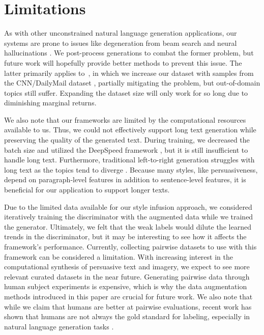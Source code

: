 \section{Limitations}
\label{sec:limitations}

As with other unconstrained natural language generation applications, our systems are prone to issues like degeneration from beam search and neural hallucinations \citep{ji2022survey}. We post-process generations to combat the former problem, but future work will hopefully provide better methods to prevent this issue. The latter primarily applies to~, in which we increase our dataset with samples from the CNN/DailyMail dataset \citep{see-etal-2017-get}, partially mitigating the problem, but out-of-domain topics still suffer. Expanding the dataset size will only work for so long due to diminishing marginal returns.

We also note that our frameworks are limited by the computational resources available to us. Thus, we could not effectively support long text generation while preserving the quality of the generated text. During training, we decreased the batch size and utilized the DeepSpeed framework \citep{rasley-2020-deepspeed}, but it is still insufficient to handle long text. Furthermore, traditional left-to-right generation struggles with long text as the topics tend to diverge \citep{Tan2020}. Because many styles, like persuasiveness, depend on paragraph-level features in addition to sentence-level features, it is beneficial for our application to support longer texts.

Due to the limited data available for our style infusion approach, we considered iteratively training the discriminator with the augmented data while we trained the generator. Ultimately, we felt that the weak labels would dilute the learned trends in the discriminator, but it may be interesting to see how it affects the framework's performance. Currently, collecting pairwise datasets to use with this framework can be considered a limitation. With increasing interest in the computational synthesis of persuasive text and imagery, we expect to see more relevant curated datasets in the near future. Generating pairwise data through human subject experiments is expensive, which is why the data augmentation methods introduced in this paper are crucial for future work. We also note that while we claim that humans are better at pairwise evaluations, recent work has shown that humans are not always the gold standard for labeling, especially in natural language generation tasks \citep{clark2021all}.

